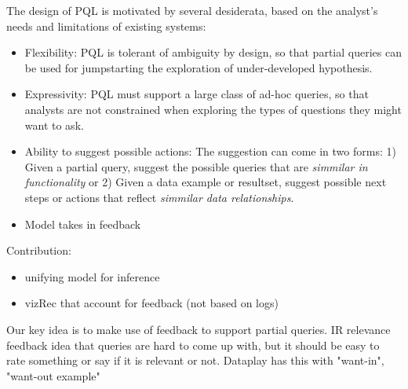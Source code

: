 \documentclass{sig-alternate-05-2015}
\begin{document}
The design of PQL is motivated by several desiderata, based on the analyst's needs and limitations of existing systems:
\begin{itemize}
	\item Flexibility: PQL is tolerant of ambiguity by design, so that partial queries can be used for jumpstarting the exploration of under-developed hypothesis.
	\item Expressivity: PQL must support a large class of ad-hoc queries, so that analysts are not constrained when exploring the types of questions they might want to ask.
	\item Ability to suggest possible actions: The suggestion can come in two forms: 1) Given a partial query, suggest the possible queries that are \textit{simmilar in functionality} or 2) Given a data example or resultset, suggest possible next steps or actions that reflect \textit{simmilar data relationships}.
	\item Model takes in feedback
\end{itemize}

Contribution: 
\begin{itemize}
\item unifying model for inference
\item vizRec that account for feedback (not based on logs)
\end{itemize}

Our key idea is to make use of feedback to support partial queries. 
IR relevance feedback
idea that queries are hard to come up with, but it should be easy to rate something or say if it is relevant or not. 
Dataplay has this with "want-in", "want-out example"
\end{document}
